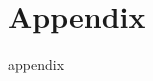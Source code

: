 \clearpage
\thispagestyle{empty}
\printbibliography
\nocite{*}
\clearpage
\thispagestyle{empty}
\appendix
\newpage
\thispagestyle{empty}
\section{Appendix}
\clearpage
{appendix}
